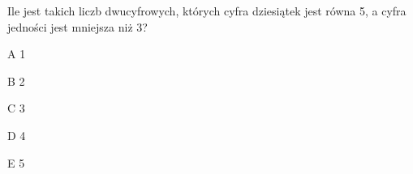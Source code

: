 \begin{tresc}
Ile jest takich liczb dwucyfrowych, których cyfra dziesiątek jest równa 5, a cyfra jedności jest mniejsza niż 3?
\end{tresc}
\begin{wariant}{A} 1 \end{wariant}
\begin{wariant}{B} 2 \end{wariant}
\begin{wariant}{C} 3 \end{wariant}
\begin{wariant}{D} 4 \end{wariant}
\begin{wariant}{E} 5 \end{wariant}
